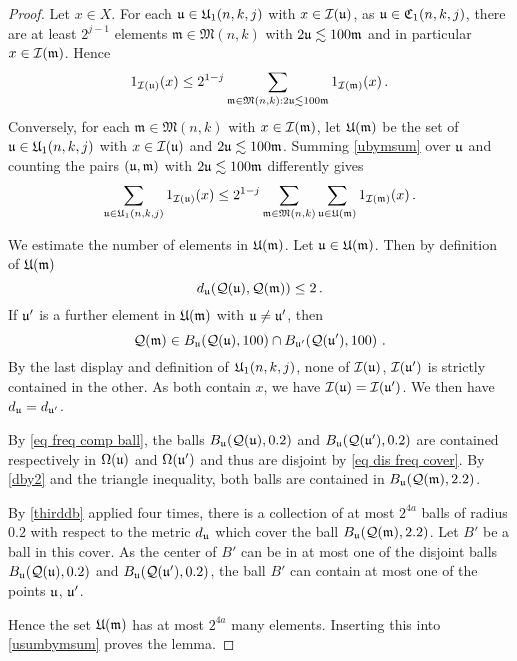 
\begin{proof}
Let $x\in X$. For each
$\fu\in \fU_1(n,k,j)$ with $x\in \sc(\fu)$, as $\fu \in \fC_1(n,k,j)$,
there are at least $2^{j-1}$  elements $\mathfrak{m}\in \mathfrak{M}(n,k)$
with $2\fu \lesssim 100\mathfrak{m}$ and in particular
$x\in \sc(\mathfrak{m})$. Hence
\begin{equation}\label{ubymsum}
        1_{\sc(\fu)}(x)
    \le 2^{1-j}\sum_{\mathfrak{m} \in \mathfrak{M}(n,k): 2\fu\lesssim 100 \mathfrak{m}} 1_{\sc(\mathfrak{m})}(x)\, .
\end{equation}
Conversely, for each $\mathfrak{m}\in \mathfrak{M}(n,k)$
with $x\in \sc(\mathfrak{m})$,
let $\fU(\mathfrak{m})$ be the set of
$\fu\in \fU_1(n,k,j)$ with $x\in \sc(\fu)$
and $2\fu \lesssim 100\mathfrak{m}$.
Summing \eqref{ubymsum} over $\fu$ and counting the pairs
$(\fu,\mathfrak{m})$ with $2\fu \lesssim 100\mathfrak{m}$
differently gives
\begin{equation}\label{usumbymsum}
        \sum_{\fu\in \fU_1(n,k,j)} 1_{\sc(\fu)}(x)
    \le 2^{1-j}\sum_{\mathfrak{m} \in \mathfrak{M}(n,k)}
    \sum_{\fu \in \fU(\mathfrak{m})} 1_{\sc(\mathfrak{m})}(x)\, .
\end{equation}



We estimate the number of elements in $\fU(\mathfrak{m})$.
Let $\fu  \in \fU(\mathfrak{m})$.
Then by definition of
$\fU(\mathfrak{m})$
\begin{equation}\label{dby2}
        d_{\fu}(\fcc(\fu),\fcc(\mathfrak{m}))\le 2\, .
\end{equation}
If $\fu'$ is a further element in $\fU(\mathfrak{m})$ with $\fu\neq \fu'$, then
\begin{equation}
    \fcc(\mathfrak{m})
    \in B_{\fu}(\fcc(\fu),100)\cap B_{\fu'}(\fcc(\fu'),100)\ .
\end{equation}
By the last display and definition of $\fU_1(n,k,j)$, none of $\sc(\fu)$, $\sc(\fu')$ is strictly contained in the other. As both contain $x$, we have $\sc(\fu)=\sc(\fu')$.
We then have $d_{\fu}=d_{\fu'}$.

By \eqref{eq freq comp ball}, the balls
$B_{\fu}(\fcc(\fu),0.2)$ and
$B_{\fu}(\fcc(\fu'),0.2)$ are
contained respectively in $\fc(\fu)$
and $\fc(\fu')$ and thus are disjoint by \eqref{eq dis freq cover}.
By \eqref{dby2} and the triangle inequality, both balls are contained in $B_{\fu}(\fcc(\mathfrak{m}), 2.2)$.

By \eqref{thirddb} applied four times, there is a collection of at most
$2^{4a}$ balls of radius $0.2$ with respect to the metric $d_{\fu}$ which cover the ball $B_{\fu}(\fcc(\mathfrak{m}),2.2)$.
Let $B'$ be a ball in this cover.
As the center of $B'$  can be in at most one of the disjoint balls
$B_{\fu}(\fcc(\fu),0.2)$ and
$B_{\fu}(\fcc(\fu'),0.2)$,
the ball $B'$ can contain at most
one of the points $\fu$, $\fu'$.

Hence the set $\fU(\mathfrak{m})$ has at most
$2^{4a}$ many elements.
Inserting this into \eqref{usumbymsum} proves the lemma.
\end{proof}

